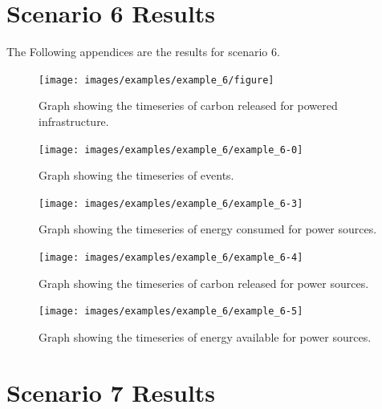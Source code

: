 \documentclass{l4proj}
\begin{document}
\begin{appendices}
\clearpage
\section{Scenario 6 Results}\label{apen:subsec:scen6}
The Following appendices are the results for scenario 6.
\clearpage
\begin{figure}[htbp]
    \centering
    \texttt{[image: images/examples/example\_6/figure]}
    ~
    \caption{Graph showing the timeseries of carbon released for powered infrastructure.}
    \label{fig:example2-0}
\end{figure}
\clearpage
\begin{figure}[htbp]
    \centering
    \texttt{[image: images/examples/example\_6/example\_6-0]}
    ~
    \caption{Graph showing the timeseries of events.}
    \label{fig:example6-0}
\end{figure}
\clearpage
\begin{figure}[htbp]
    \centering
    \texttt{[image: images/examples/example\_6/example\_6-3]}
    ~
    \caption{Graph showing the timeseries of energy consumed for power sources.}
    \label{fig:example6-1}
\end{figure}
\clearpage
\begin{figure}[htbp]
    \centering
    \texttt{[image: images/examples/example\_6/example\_6-4]}
    ~
    \caption{Graph showing the timeseries of carbon released for power sources.}
    \label{fig:example6-2}
\end{figure}
\clearpage
\begin{figure}[htbp]
    \centering
    \texttt{[image: images/examples/example\_6/example\_6-5]}
    ~
    \caption{Graph showing the timeseries of energy available for power sources.}
    \label{fig:example6-3}
\end{figure}

\clearpage
\section{Scenario 7 Results}\label{apen:subsec:scen7}

\end{appendices}
\end{document}
